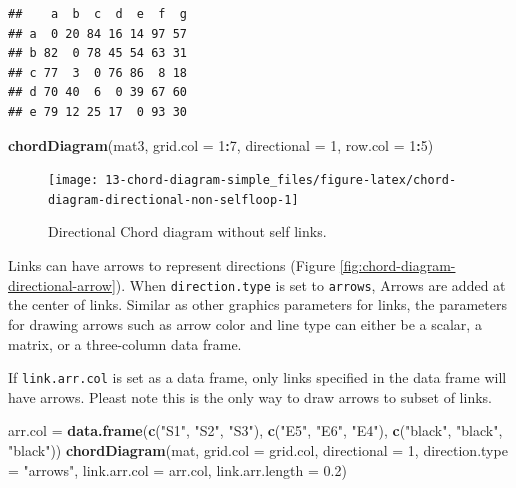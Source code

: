 \documentclass[]{book}
\newenvironment{Shaded}{\begin{snugshade}}{\end{snugshade}}
\newcommand{\KeywordTok}[1]{\textcolor[rgb]{0.13,0.29,0.53}{\textbf{#1}}}
\newcommand{\DataTypeTok}[1]{\textcolor[rgb]{0.13,0.29,0.53}{#1}}
\newcommand{\DecValTok}[1]{\textcolor[rgb]{0.00,0.00,0.81}{#1}}
\newcommand{\FloatTok}[1]{\textcolor[rgb]{0.00,0.00,0.81}{#1}}
\newcommand{\StringTok}[1]{\textcolor[rgb]{0.31,0.60,0.02}{#1}}
\newcommand{\OperatorTok}[1]{\textcolor[rgb]{0.81,0.36,0.00}{\textbf{#1}}}
\newcommand{\NormalTok}[1]{#1}
\theoremstyle{definition}
\theoremstyle{definition}
\theoremstyle{remark}
\begin{document}
\begin{verbatim}
##    a  b  c  d  e  f  g
## a  0 20 84 16 14 97 57
## b 82  0 78 45 54 63 31
## c 77  3  0 76 86  8 18
## d 70 40  6  0 39 67 60
## e 79 12 25 17  0 93 30
\end{verbatim}

\begin{Shaded}
\begin{Highlighting}[]
\KeywordTok{chordDiagram}\NormalTok{(mat3, }\DataTypeTok{grid.col =} \DecValTok{1}\OperatorTok{:}\DecValTok{7}\NormalTok{, }\DataTypeTok{directional =} \DecValTok{1}\NormalTok{, }\DataTypeTok{row.col =} \DecValTok{1}\OperatorTok{:}\DecValTok{5}\NormalTok{)}
\end{Highlighting}
\end{Shaded}

\begin{figure}

{\centering \texttt{[image: 13-chord-diagram-simple\_files/figure-latex/chord-diagram-directional-non-selfloop-1]} 

}

\caption{Directional Chord diagram without self links.}\label{fig:chord-diagram-directional-non-selfloop}
\end{figure}

Links can have arrows to represent directions (Figure
\ref{fig:chord-diagram-directional-arrow}). When \texttt{direction.type}
is set to \texttt{arrows}, Arrows are added at the center of links.
Similar as other graphics parameters for links, the parameters for
drawing arrows such as arrow color and line type can either be a scalar,
a matrix, or a three-column data frame.

If \texttt{link.arr.col} is set as a data frame, only links specified in
the data frame will have arrows. Pleast note this is the only way to
draw arrows to subset of links.

\begin{Shaded}
\begin{Highlighting}[]
\NormalTok{arr.col =}\StringTok{ }\KeywordTok{data.frame}\NormalTok{(}\KeywordTok{c}\NormalTok{(}\StringTok{"S1"}\NormalTok{, }\StringTok{"S2"}\NormalTok{, }\StringTok{"S3"}\NormalTok{), }\KeywordTok{c}\NormalTok{(}\StringTok{"E5"}\NormalTok{, }\StringTok{"E6"}\NormalTok{, }\StringTok{"E4"}\NormalTok{), }
    \KeywordTok{c}\NormalTok{(}\StringTok{"black"}\NormalTok{, }\StringTok{"black"}\NormalTok{, }\StringTok{"black"}\NormalTok{))}
\KeywordTok{chordDiagram}\NormalTok{(mat, }\DataTypeTok{grid.col =}\NormalTok{ grid.col, }\DataTypeTok{directional =} \DecValTok{1}\NormalTok{, }\DataTypeTok{direction.type =} \StringTok{"arrows"}\NormalTok{,}
    \DataTypeTok{link.arr.col =}\NormalTok{ arr.col, }\DataTypeTok{link.arr.length =} \FloatTok{0.2}\NormalTok{)}
\end{Highlighting}
\end{Shaded}
\end{document}
